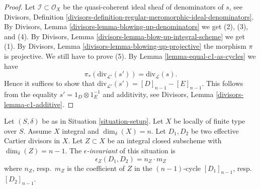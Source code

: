 \begin{proof}
Let $\mathcal{I} \subset \mathcal{O}_X$ be the quasi-coherent ideal sheaf
of denominators of $s$, see Divisors, Definition
\ref{divisors-definition-regular-meromorphic-ideal-denominators}.
By Divisors, Lemma \ref{divisors-lemma-blowing-up-denominators}
we get (2), (3), and (4).
By Divisors, Lemma \ref{divisors-lemma-blow-up-integral-scheme}
we get (1). By Divisors, Lemma \ref{divisors-lemma-blowing-up-projective}
the morphism $\pi$ is projective.
We still have to prove (5).
By Lemma \ref{lemma-equal-c1-as-cycles} we have
$$
\pi_*(\text{div}_{\mathcal{L}'}(s')) = \text{div}_\mathcal{L}(s).
$$
Hence it suffices to show that
$\text{div}_{\mathcal{L}'}(s') = [D]_{n - 1} - [E]_{n - 1}$.
This follows from the equality
$s' = 1_D \otimes 1_E^{-1}$ and additivity, see
Divisors, Lemma \ref{divisors-lemma-c1-additive}.
\end{proof}

\begin{definition}
\label{definition-epsilon}
Let $(S, \delta)$ be as in Situation \ref{situation-setup}.
Let $X$ be locally of finite type over $S$.
Assume $X$ integral and $\dim_\delta(X) = n$.
Let $D_1, D_2$ be two effective Cartier divisors in $X$.
Let $Z \subset X$ be an integral closed subscheme
with $\dim_\delta(Z) = n - 1$. The {\it $\epsilon$-invariant}
of this situation is
$$
\epsilon_Z(D_1, D_2) = n_Z \cdot m_Z
$$
where $n_Z$, resp.\ $m_Z$ is the coefficient of
$Z$ in the $(n - 1)$-cycle $[D_1]_{n - 1}$, resp.\ $[D_2]_{n - 1}$.
\end{definition}

